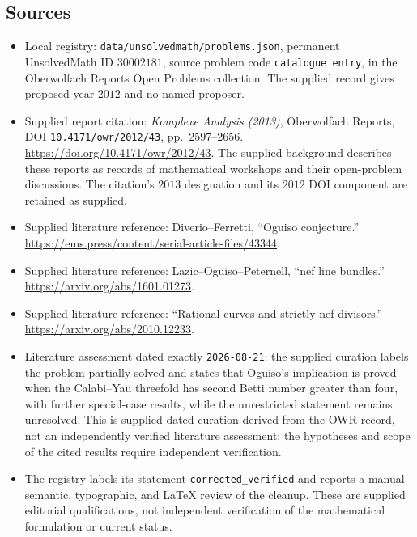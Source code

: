 \documentclass[11pt]{article}
\begin{document}
\subsection{Sources}
\begin{itemize}
\item Local registry: \texttt{data/unsolvedmath/problems.json}, permanent UnsolvedMath ID \(30002181\), source problem code \texttt{catalogue entry}, in the Oberwolfach Reports Open Problems collection. The supplied record gives proposed year \(2012\) and no named proposer.
\item Supplied report citation: \emph{Komplexe Analysis (2013)}, Oberwolfach Reports, DOI \texttt{10.4171/owr/2012/43}, pp.\ 2597--2656. \url{https://doi.org/10.4171/owr/2012/43}. The supplied background describes these reports as records of mathematical workshops and their open-problem discussions. The citation's \(2013\) designation and its \(2012\) DOI component are retained as supplied.
\item Supplied literature reference: Diverio--Ferretti, ``Oguiso conjecture.'' \url{https://ems.press/content/serial-article-files/43344}.
\item Supplied literature reference: Lazic--Oguiso--Peternell, ``nef line bundles.'' \url{https://arxiv.org/abs/1601.01273}.
\item Supplied literature reference: ``Rational curves and strictly nef divisors.'' \url{https://arxiv.org/abs/2010.12233}.
\item Literature assessment dated exactly \texttt{2026-08-21}: the supplied curation labels the problem partially solved and states that Oguiso's implication is proved when the Calabi--Yau threefold has second Betti number greater than four, with further special-case results, while the unrestricted statement remains unresolved. This is supplied dated curation derived from the OWR record, not an independently verified literature assessment; the hypotheses and scope of the cited results require independent verification.
\item The registry labels its statement \texttt{corrected\_verified} and reports a manual semantic, typographic, and LaTeX review of the cleanup. These are supplied editorial qualifications, not independent verification of the mathematical formulation or current status.
\end{itemize}
\end{document}
